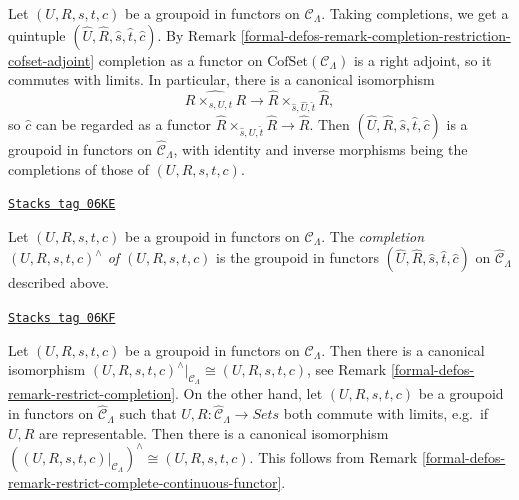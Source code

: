 Let $(U, R, s, t, c)$ be a groupoid in functors on $\mathcal{C}_\Lambda$.
Taking completions, we get a quintuple
$(\widehat{U}, \widehat{R}, \widehat{s}, \widehat{t}, \widehat{c})$. By
Remark \ref{formal-defos-remark-completion-restriction-cofset-adjoint}
completion as a functor on $\text{CofSet}(\mathcal{C}_\Lambda)$ is a right
adjoint, so it commutes with limits. In particular, there is a canonical
isomorphism
$$
\widehat{R \times_{s, U, t} R}
\longrightarrow
\widehat{R} \times_{\widehat{s}, \widehat{U}, \widehat{t}} \widehat{R},
$$
so $\widehat{c}$ can be regarded as a functor
$\widehat{R} \times_{\widehat{s}, \widehat{U}, \widehat{t}} \widehat{R} \to
\widehat{R}$. Then
$(\widehat{U}, \widehat{R}, \widehat{s}, \widehat{t}, \widehat{c})$
is a groupoid in functors on $\widehat{\mathcal{C}}_\Lambda$, with
identity and inverse morphisms being the completions of those of
$(U, R, s, t, c)$.

\begin{definition}
\label{formal-defos-definition-completion-groupoid-in-functors}
\href{https://stacks.math.columbia.edu/tag/06KE}{\texttt{Stacks tag 06KE}}

Let $(U, R, s, t, c)$ be a groupoid in functors on $\mathcal{C}_\Lambda$.
The {\it completion $(U, R, s, t, c)^{\wedge}$ of $(U, R, s, t, c)$} is the
groupoid in functors
$(\widehat{U}, \widehat{R}, \widehat{s}, \widehat{t}, \widehat{c})$
on $\widehat{\mathcal{C}}_\Lambda$ described above.
\end{definition}

\begin{remark}
\label{formal-defos-remark-groupoid-in-functors-complete-restrict}
\href{https://stacks.math.columbia.edu/tag/06KF}{\texttt{Stacks tag 06KF}}

Let $(U, R, s, t, c)$ be a groupoid in functors on $\mathcal{C}_\Lambda$.
Then there is a canonical isomorphism
$(U, R, s, t, c)^{\wedge}|_{\mathcal{C}_\Lambda} \cong (U, R, s, t, c)$, see
Remark \ref{formal-defos-remark-restrict-completion}.
On the other hand, let $(U, R, s, t, c)$ be a groupoid in functors on
$\widehat{\mathcal{C}}_\Lambda$ such that
$U, R : \widehat{\mathcal{C}}_\Lambda \to \textit{Sets}$
both commute with limits, e.g.\ if $U, R$ are representable.
Then there is a canonical isomorphism
$((U, R, s, t, c)|_{\mathcal{C}_\Lambda})^{\wedge} \cong (U, R, s, t, c)$.
This follows from
Remark \ref{formal-defos-remark-restrict-complete-continuous-functor}.
\end{remark}

